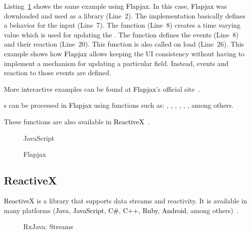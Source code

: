 \documentclass[type=bsc,accentcolor=tud9c]{tudthesis}
\newcommand{\framework}[1]{\textcolor{black}{#1}}
\begin{document}
Listing~\ref{code:flapjax} shows the same example using \framework{Flapjax}. In this case, \framework{Flapjax} was downloaded and used as a library (Line~2). The implementation basically defines a behavior for the input  (Line~7). The function  (Line~8) creates a time varying value which is used for updating the . The function  defines the events (Line~8) and their reaction (Line~20). This function is also called on load (Line~26). This example shows how \framework{Flapjax} allows keeping the UI consistency without having to implement a mechanism for updating a particular field. Instead, events and reaction to those events are defined.

More interactive examples can be found at \framework{Flapjax}'s official site~\cite{urlFlapjaxDemo}.

s can be processed in \framework{Flapjax} using functions such as: , , , , , , among others.

These functions are also available in \framework{ReactiveX}~\cite{reactiveX}.

\begin{figure}[]
\begin{minipage}{0.48\textwidth}
\begin{sourcecode}

\caption{JavaScript}
\label{code:javaScript}
\end{sourcecode}
\end{minipage}\hspace{0.75cm}
\begin{minipage}{0.49\textwidth}
\begin{sourcecode}

\caption{Flapjax}
\label{code:flapjax}
\end{sourcecode}
\end{minipage}
\end{figure}


\subsection{ReactiveX}
\framework{ReactiveX} is a library that supports data streams and reactivity. It is available in many platforms (\framework{Java}, \framework{JavaScript}, \framework{C\#}, \framework{C++}, \framework{Ruby}, \framework{Android}, among others)~\cite{reactiveX}. 

\begin{figure}[]
\begin{sourcecode}

\caption{RxJava: Streams}
\label{code:rxJava-streams}
\end{sourcecode}
\end{figure}
\end{document}
